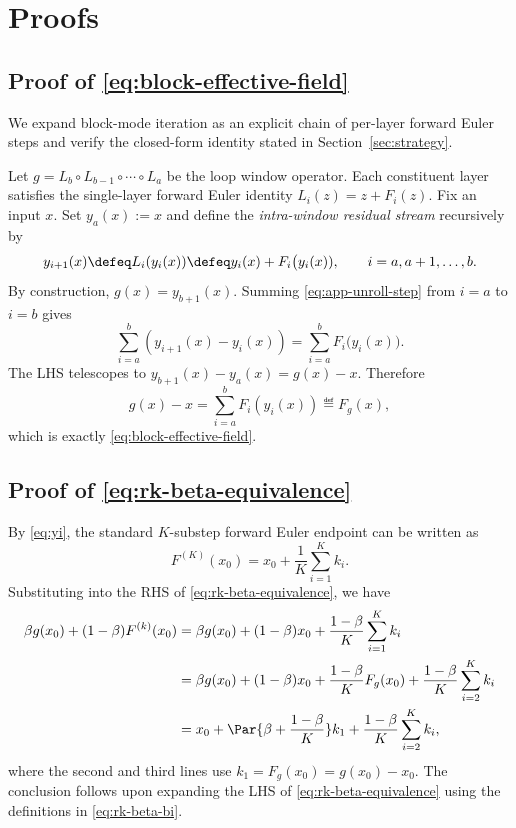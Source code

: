 \section{Proofs}
\label{app:block-unroll}

\subsection{Proof of \texorpdfstring{\eqref{eq:block-effective-field}}{(9)}}

We expand block-mode iteration as an explicit chain of per-layer forward Euler steps and verify the closed-form identity stated in Section~\ref{sec:strategy}.

Let $g = L_b \circ L_{b-1} \circ \cdots \circ L_a$ be the loop window operator. Each constituent layer satisfies the single-layer forward Euler identity $L_i(z) = z + F_i(z)$. Fix an input $x$. Set $y_a(x) := x$ and define the \emph{intra-window residual stream} recursively by
\begin{equation}
y_{i+1}(x) \defeq L_i(y_i(x))
        \defeq y_i(x) + F_i\bigl(y_i(x)),
\qquad i = a, a+1, \ldots, b.
\label{eq:app-unroll-step}
\end{equation}
By construction, $g(x) = y_{b+1}(x)$. Summing \eqref{eq:app-unroll-step} from
$i = a$ to $i = b$ gives
\begin{equation*}
\sum_{i=a}^{b} (y_{i+1}(x) - y_i(x))
   = \sum_{i=a}^{b} F_i\bigl(y_i(x)).
\end{equation*}
The LHS telescopes to $y_{b+1}(x) - y_a(x) = g(x) - x$. Therefore
\begin{equation}
g(x) - x = \sum_{i=a}^{b} F_i(y_i(x)) \eqdef F_g(x),
\label{eq:app-block-effective-field}
\end{equation}
which is exactly \eqref{eq:block-effective-field}.

\subsection{Proof of \texorpdfstring{\eqref{eq:rk-beta-equivalence}}{(16)}}

By \eqref{eq:yi}, the standard $K$-substep forward Euler endpoint can be written as \[ F^{(K)}(x_0)=x_0+\frac{1}{K}\sum_{i=1}^{K}k_i. \] Substituting into the RHS of \eqref{eq:rk-beta-equivalence}, we have \begin{align*}
    \beta g(x_0)+(1-\beta)F^{(k)}(x_0)&=\beta g(x_0)+(1-\beta)x_0+\frac{1-\beta}{K}\sum_{i=1}^{K}k_i\\
    &=\beta g(x_0)+(1-\beta)x_0+\frac{1-\beta}{K}F_g(x_0)+\frac{1-\beta}{K}\sum_{i=2}^Kk_i\\
    &=x_0+\Par{\beta+\frac{1-\beta}{K}}k_1+\frac{1-\beta}{K}\sum_{i=2}^Kk_i,
\end{align*}
where the second and third lines use $k_1=F_g(x_0)=g(x_0)-x_0$. The conclusion follows upon expanding the LHS of \eqref{eq:rk-beta-equivalence} using the definitions in \eqref{eq:rk-beta-bi}.

